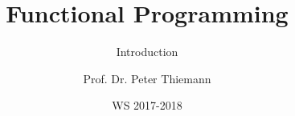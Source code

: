
\title{Functional Programming}
\subtitle{Introduction}

\author[Peter Thiemann]{Prof. Dr. Peter Thiemann}
\date{WS 2017-2018}


